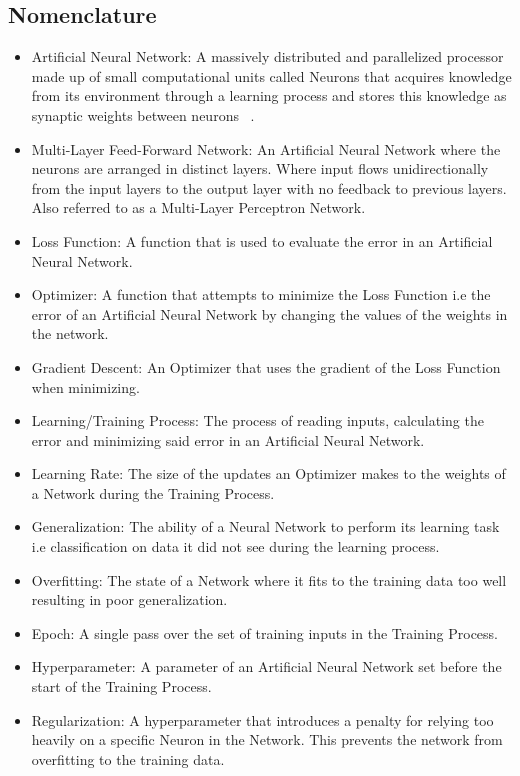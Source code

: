 \documentclass{article}
\begin{document}
\subsection*{Nomenclature}
\begin{itemize}
	\item Artificial Neural Network: A massively distributed and parallelized processor made up of small computational units called Neurons that acquires knowledge from its environment through a learning process and stores this knowledge as synaptic weights between neurons ~\cite{ANNDefinition}.
	\item Multi-Layer Feed-Forward Network: An Artificial Neural Network where the neurons are arranged in distinct layers. Where input flows unidirectionally from the input layers to the output layer with no feedback to previous layers. Also referred to as a Multi-Layer Perceptron Network.  
	\item Loss Function: A function that is used to evaluate the error in an Artificial Neural Network. 
	\item Optimizer: A function that attempts to minimize the Loss Function i.e the error of an Artificial Neural Network by changing the values of the weights in the network.
	\item Gradient Descent: An Optimizer that uses the gradient of the Loss Function when minimizing.
	\item Learning/Training Process: The process of reading inputs, calculating the error and minimizing said error in an Artificial Neural Network. 
	\item Learning Rate: The size of the updates an Optimizer makes to the weights of a Network during the Training Process.
	\item Generalization: The ability of a Neural Network to perform its learning task i.e classification on data it did not see during the learning process. 
	\item Overfitting: The state of a Network where it fits to the training data too well resulting in poor generalization.
	\item Epoch: A single pass over the set of training inputs in the Training Process.
	\item Hyperparameter: A parameter of an Artificial Neural Network set before the start of the Training Process.
	\item Regularization: A hyperparameter that introduces a penalty for relying too heavily on a specific Neuron in the Network. This prevents the network from overfitting to the training data.

\end{itemize}
\end{document}
